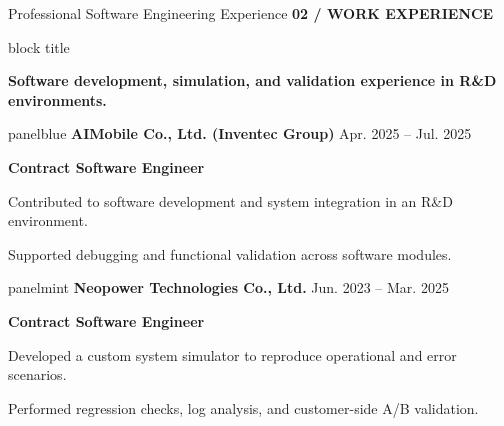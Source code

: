 \documentclass[aspectratio=169,10pt]{beamer}
\newcommand{\smalllabel}[1]{{\scriptsize\bfseries\color{Accent}\MakeUppercase{#1}}}
\newcommand{\takeaway}[1]{%
  \begin{beamercolorbox}[rounded=true,sep=0.15cm,wd=\linewidth]{block title}%
    \strut\textbf{#1}\strut
  \end{beamercolorbox}%
}
\newcommand{\slidenavigation}{}
\newcommand{\slideposition}{}
\newcommand{\slidesubtitle}[1]{%
  \smalllabel{#1}%
}
\begin{document}
\renewcommand{\slidenavigation}{\hyperlink{details-index}{\beamerbutton{Details index}}}
\renewcommand{\slideposition}{Summary 3 / 18}
\begin{frame}[label=summary-3]{Professional Software Engineering Experience}
  \vspace{0.04cm}
  \slidesubtitle{02 / Work Experience}\par\vspace{0.10cm}
  \takeaway{Software development, simulation, and validation experience in R\&D environments.}
  \vfill

  \begin{beamercolorbox}[rounded=true,sep=0.19cm,wd=\linewidth]{panelblue}
    {\normalsize\bfseries\color{Ink}AIMobile Co., Ltd. (Inventec Group)}\hfill
    {\scriptsize\color{Muted}Apr. 2025 -- Jul. 2025}\par
    \vspace{0.07cm}
    {\small\bfseries\color{AccentBlue}Contract Software Engineer}\par
    \vspace{0.14cm}
    {\small\color{Ink}Contributed to software development and system integration in an R\&D environment.}\par
    \vspace{0.08cm}
    {\small\color{Ink}Supported debugging and functional validation across software modules.}\par
  \end{beamercolorbox}

  \vfill
  \begin{beamercolorbox}[rounded=true,sep=0.19cm,wd=\linewidth]{panelmint}
    {\normalsize\bfseries\color{Ink}Neopower Technologies Co., Ltd.}\hfill
    {\scriptsize\color{Muted}Jun. 2023 -- Mar. 2025}\par
    \vspace{0.07cm}
    {\small\bfseries\color{Accent}Contract Software Engineer}\par
    \vspace{0.14cm}
    {\small\color{Ink}Developed a custom system simulator to reproduce operational and error scenarios.}\par
    \vspace{0.08cm}
    {\small\color{Ink}Performed regression checks, log analysis, and customer-side A/B validation.}\par
  \end{beamercolorbox}
  \vfill
\end{frame}
\end{document}
